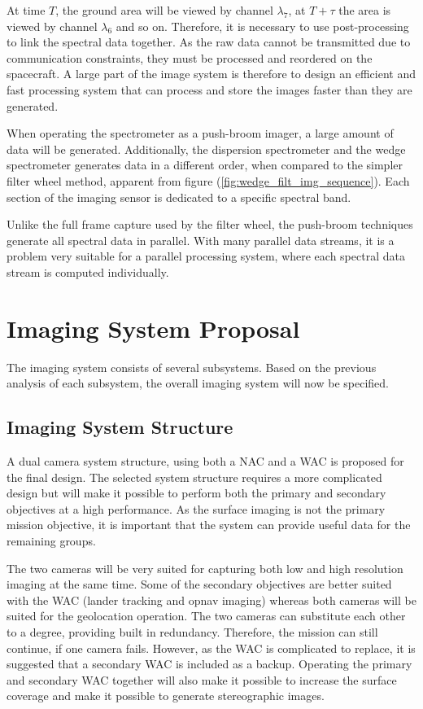 At time $T$, the ground area will be viewed by channel $\lambda_7$, at $T+\tau$ the area is viewed by channel $\lambda_6$ and so on. Therefore, it is necessary to use post-processing to link the spectral data together. As the raw data cannot be transmitted due to communication constraints, they must be processed and reordered on the spacecraft. A large part of the image system is therefore to design an efficient and fast processing system that can process and store the images faster than they are generated.

When operating the spectrometer as a push-broom imager, a large amount of data will be generated. Additionally, the dispersion spectrometer and the wedge spectrometer generates data in a different order, when compared to the simpler filter wheel method, apparent from figure (\ref{fig:wedge_filt_img_sequence}). Each section of the imaging sensor is dedicated to a specific spectral band. 

Unlike the full frame capture used by the filter wheel, the push-broom techniques generate all spectral data in parallel. With many parallel data streams, it is a problem very suitable for a parallel processing system, where each spectral data stream is computed individually.
\section{Imaging System Proposal}
The imaging system consists of several subsystems. Based on the previous analysis of each subsystem, the overall imaging system will now be specified.
\subsection{Imaging System Structure}
A dual camera system structure, using both a NAC and a WAC is proposed for the final design. The selected system structure requires a more complicated design but will make it possible to perform both the primary and secondary objectives at a high performance. As the surface imaging is not the primary mission objective, it is important that the system can provide useful data for the remaining groups.

The two cameras will be very suited for capturing both low and high resolution imaging at the same time. Some of the secondary objectives are better suited with the WAC (lander tracking and opnav imaging) whereas both cameras will be suited for the geolocation operation. The two cameras can substitute each other to a degree, providing built in redundancy. Therefore, the mission can still continue, if one camera fails. However, as the WAC is complicated to replace, it is suggested that a secondary WAC is included as a backup. Operating the primary and secondary WAC together will also make it possible to increase the surface coverage and make it possible to generate stereographic images. 
